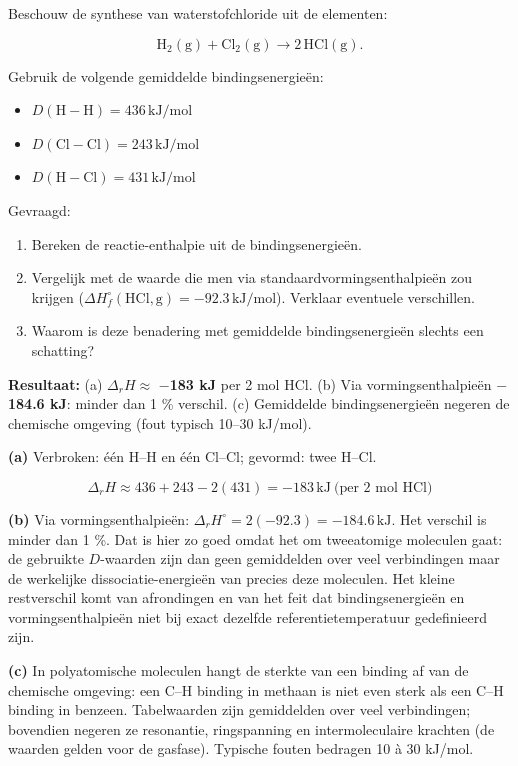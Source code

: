 \begin{oefening}
Beschouw de synthese van waterstofchloride uit de elementen:

\[
\mathrm{H_2(g) + Cl_2(g) \rightarrow 2\,HCl(g)}.
\]

Gebruik de volgende gemiddelde bindingsenergieën:

\begin{itemize}
\item
  \(D(\mathrm{H{-}H}) = 436\,\mathrm{kJ/mol}\)
\item
  \(D(\mathrm{Cl{-}Cl}) = 243\,\mathrm{kJ/mol}\)
\item
  \(D(\mathrm{H{-}Cl}) = 431\,\mathrm{kJ/mol}\)
\end{itemize}

Gevraagd:

\begin{enumerate}
\item[(a)]
  Bereken de reactie-enthalpie uit de bindingsenergieën.
\item[(b)]
  Vergelijk met de waarde die men via standaardvormingsenthalpieën zou krijgen (\(\Delta H_f^\circ(\mathrm{HCl,g}) = -92.3\,\mathrm{kJ/mol}\)). Verklaar eventuele verschillen.
\item[(c)]
  Waarom is deze benadering met gemiddelde bindingsenergieën slechts een schatting?
\end{enumerate}
\end{oefening}
\begin{oplossing}
\textbf{Resultaat:} (a) \(\Delta_r H \approx\) \textbf{\ensuremath{-}183 kJ} per 2 mol HCl. (b) Via vormingsenthalpieën \textbf{\ensuremath{-}184.6 kJ}: minder dan 1 \% verschil. (c) Gemiddelde bindingsenergieën negeren de chemische omgeving (fout typisch 10--30 kJ/mol).

\textbf{(a)} Verbroken: één H--H en één Cl--Cl; gevormd: twee H--Cl.

\[
\Delta_r H \approx 436 + 243 - 2(431) = -183\,\mathrm{kJ}\ \text{(per 2 mol HCl)}
\]

\textbf{(b)} Via vormingsenthalpieën: \(\Delta_r H^\circ = 2(-92.3) = -184.6\,\mathrm{kJ}\). Het verschil is minder dan 1 \%. Dat is hier zo goed omdat het om tweeatomige moleculen gaat: de gebruikte \(D\)-waarden zijn dan geen gemiddelden over veel verbindingen maar de werkelijke dissociatie-energieën van precies deze moleculen. Het kleine restverschil komt van afrondingen en van het feit dat bindingsenergieën en vormingsenthalpieën niet bij exact dezelfde referentietemperatuur gedefinieerd zijn.

\textbf{(c)} In polyatomische moleculen hangt de sterkte van een binding af van de chemische omgeving: een C--H binding in methaan is niet even sterk als een C--H binding in benzeen. Tabelwaarden zijn gemiddelden over veel verbindingen; bovendien negeren ze resonantie, ringspanning en intermoleculaire krachten (de waarden gelden voor de gasfase). Typische fouten bedragen 10 à 30 kJ/mol.
\end{oplossing}

